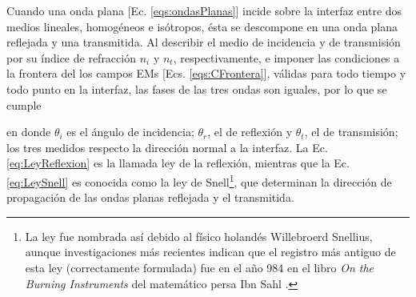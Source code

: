 Cuando una onda plana [Ec. \eqref{eqs:ondasPlanas}] incide sobre la interfaz entre dos medios lineales, homogéneos e isótropos, ésta se descompone en una onda plana reflejada y una transmitida. Al describir el medio de incidencia y de transmisión por su índice de refracción $n_i$ y $n_t$, respectivamente, e imponer las condiciones a la frontera del los campos EMs [Ecs. \eqref{eqs:CFrontera}], válidas para todo tiempo y todo punto en la interfaz, las fases de las tres ondas son iguales, por lo que se cumple \vspace*{-.75em} 
%
	\begin{tcolorbox}[title = Ley de la reflexión y ley de Snell ]
	\end{tcolorbox}	 \vspace*{-.75em}\noindent
%
en donde $\theta_i$ es el ángulo de incidencia; $\theta_r$, el de reflexión y $\theta_t$, el de transmisión; los tres medidos respecto la dirección normal a la interfaz. La Ec. \eqref{eq:LeyReflexion} es la llamada ley de la reflexión, mientras que la Ec. \eqref{eq:LeySnell} es conocida como la ley de Snell\footnote{La ley fue nombrada así debido al físico holandés Willebroerd Snellius, aunque investigaciones más recientes indican que el registro más antiguo de esta ley (correctamente formulada) fue en el año 984 en el libro \emph{On the Burning Instruments} del matemático persa Ibn Sahl \cite{kwan2002really}.}, que determinan la dirección de propagación de las ondas planas reflejada y el transmitida.

